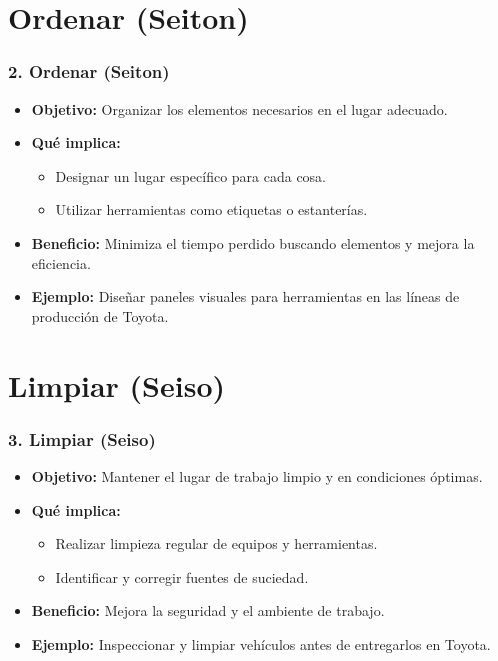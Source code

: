 \documentclass{beamer}
\begin{document}
\section{Ordenar (Seiton)}
\begin{frame}
\frametitle{2. Ordenar (Seiton)}
\begin{itemize}
    \item \textbf{Objetivo:} Organizar los elementos necesarios en el lugar adecuado.
    \item \textbf{Qué implica:}
        \begin{itemize}
            \item Designar un lugar específico para cada cosa.
            \item Utilizar herramientas como etiquetas o estanterías.
        \end{itemize}
    \item \textbf{Beneficio:} Minimiza el tiempo perdido buscando elementos y mejora la eficiencia.
    \item \textbf{Ejemplo:} Diseñar paneles visuales para herramientas en las líneas de producción de Toyota.
\end{itemize}
\end{frame}

\section{Limpiar (Seiso)}
\begin{frame}
\frametitle{3. Limpiar (Seiso)}
\begin{itemize}
    \item \textbf{Objetivo:} Mantener el lugar de trabajo limpio y en condiciones óptimas.
    \item \textbf{Qué implica:}
        \begin{itemize}
            \item Realizar limpieza regular de equipos y herramientas.
            \item Identificar y corregir fuentes de suciedad.
        \end{itemize}
    \item \textbf{Beneficio:} Mejora la seguridad y el ambiente de trabajo.
    \item \textbf{Ejemplo:} Inspeccionar y limpiar vehículos antes de entregarlos en Toyota.
\end{itemize}
\end{frame}
\end{document}
